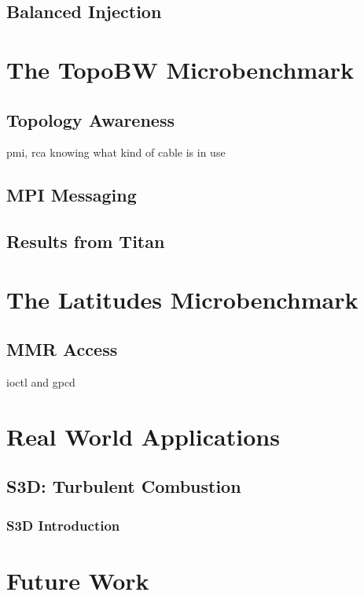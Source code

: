\documentclass[10pt, conference, compsocconf]{IEEEtran}
\begin{document}
\subsection{Balanced Injection}

\section{The TopoBW Microbenchmark}

\subsection{Topology Awareness}
pmi, rca
knowing what kind of cable is in use

\subsection{MPI Messaging}

\subsection{Results from Titan}

\section{The Latitudes Microbenchmark}

\subsection{MMR Access}
ioctl and gpcd


\section{Real World Applications}

\subsection{S3D: Turbulent Combustion}

\subsubsection{S3D Introduction}



\section{Future Work}
\end{document}
